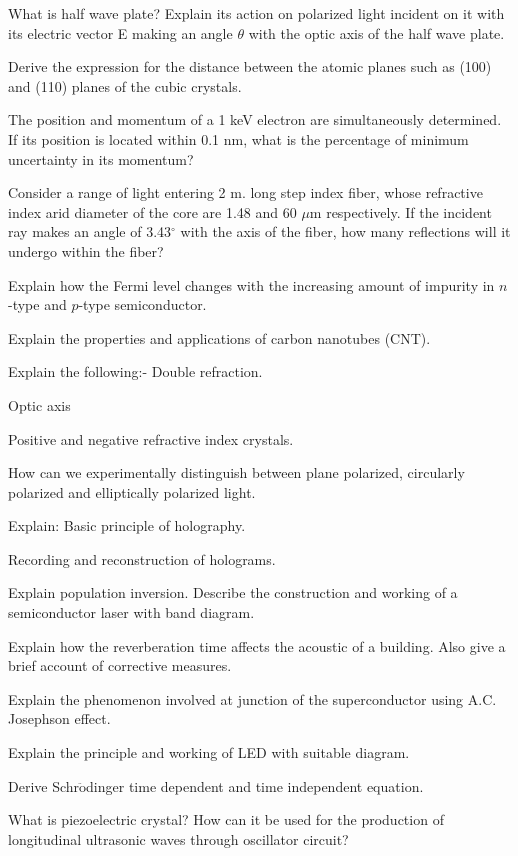 \item What is half wave plate? Explain its action on polarized light incident on it with its
  electric vector E making an angle $\theta$ with the optic axis of the half wave plate.
\item Derive the expression for the distance between the atomic planes such as (100) and (110) planes
  of the cubic crystals.
\item The position and momentum of a 1 keV electron are simultaneously determined. If its position is
  located within 0.1 nm, what is the percentage of minimum uncertainty in its momentum?
\item Consider a range of light entering 2 m. long step index fiber, whose refractive index arid diameter
  of the core are 1.48 and 60 $\mu$m respectively. If the incident ray makes an angle of 3.43$^{\circ}$ with the
  axis of the fiber, how many reflections will it undergo within the fiber?
\item Explain how the Fermi level changes with the increasing amount of impurity in $n$-type and $p$-type
 semiconductor.
\item Explain the properties and applications of carbon nanotubes (CNT).

\markB

\newpage \again

\partCo

\item \iitem Explain the following:-
\iitem Double refraction.
\item Optic axis
\item Positive
  and negative refractive index crystals.
\ene

  How can we experimentally distinguish between plane polarized, circularly polarized and 
  elliptically polarized light.
\Or
\item Explain:
\iitem Basic principle of holography.
\item Recording and reconstruction of holograms.
\ene
\ene

\item \iitem Explain population inversion. Describe the construction and working of a semiconductor
  laser with band diagram.
\Or
\item Explain how the reverberation time affects the acoustic of a building. Also give a brief account
  of corrective measures.
\ene

\item \iitem Explain the phenomenon involved at junction of the superconductor using A.C. Josephson effect.
\Or
\item Explain the principle and working of LED with suitable diagram.
\ene

\item \iitem Derive Schr$\ddot{\text{o}}$dinger time dependent and time independent equation.
\Or
\item What is piezoelectric crystal? How can it be used for the production of longitudinal ultrasonic
  waves through oscillator circuit?
\ene

\markC
\ene
